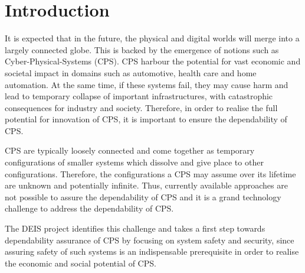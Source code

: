 \section{Introduction}
It is expected that in the future, the physical and digital worlds will merge into a largely connected globe. This is backed by the emergence of notions such as Cyber-Physical-Systems (CPS). 
CPS harbour the potential for vast economic and societal impact in domains such as automotive, health care and home automation. At the same time, if these systems fail, they may cause harm and lead to temporary collapse of important infrastructures, with catastrophic consequences for industry and society. 
Therefore, in order to realise the full potential for innovation of CPS, it is important to ensure the dependability of CPS.

CPS are typically loosely connected and come together as temporary configurations of smaller systems which dissolve and give place to other configurations. Therefore, the configurations a CPS may assume over its lifetime are unknown and potentially infinite. Thus, currently available approaches are not possible to assure the dependability of CPS and it is a grand technology challenge to address the dependability of CPS. 

The DEIS project identifies this challenge and takes a first step towards dependability assurance of CPS by focusing on system safety and security, since assuring safety of such systems is an indispensable prerequisite in order to realise the economic and social potential of CPS.




